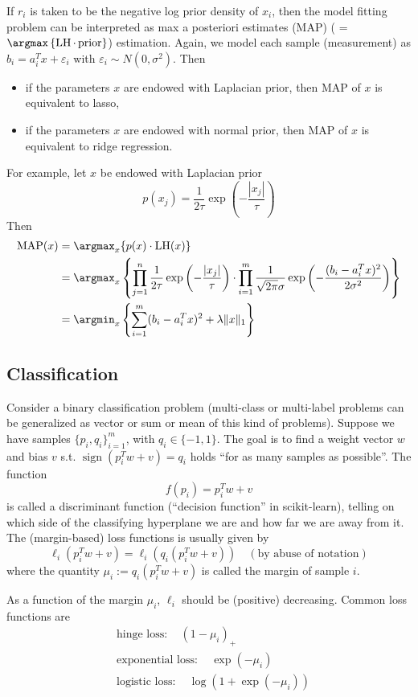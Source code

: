 If $r_i$ is taken to be the negative log prior density of $x_i$, then the model fitting problem can be interpreted as max a posteriori estimates (MAP) ( = $\argmax \left\{ \operatorname{LH} \cdot \operatorname{prior}\right\}$) estimation. Again, we model each sample (measurement) as
$b_i = a_i^Tx + \varepsilon_i$ with $\varepsilon_i \sim N(0, \sigma^2)$. Then 
\begin{itemize}
    \item if the parameters $x$ are endowed with Laplacian prior, then MAP of $x$ is equivalent to lasso,
    \item if the parameters $x$ are endowed with normal prior, then MAP of $x$ is equivalent to ridge regression.
\end{itemize}
For example, let $x$ be endowed with Laplacian prior
$$p(x_j) = \dfrac{1}{2\tau}\exp\left( -\dfrac{|x_j|}{\tau} \right)$$
Then
\begin{align*}
\operatorname{MAP}(x) & = \argmax_x \{p(x) \cdot \operatorname{LH}(x) \} \\
& = \argmax_x \left\{ \prod\limits_{j=1}^n \dfrac{1}{2\tau}\exp\left( -\dfrac{|x_j|}{\tau} \right) \cdot \prod\limits_{i=1}^m \dfrac{1}{\sqrt{2\pi}\sigma} \exp\left(-\frac{(b_i-a_i^Tx)^2}{2\sigma^2}\right) \right\} \\
& = \argmin_x \left\{ \sum\limits_{i=1}^m (b_i-a_i^Tx)^2 + \lambda \lVert x \rVert_1 \right\}
\end{align*}

\subsection{Classification}

Consider a binary classification problem (multi-class or multi-label problems can be generalized as vector or sum or mean of this kind of problems). Suppose we have samples $\{p_i,q_i\}_{i=1}^m$, with $q_i\in\{-1,1\}$. The goal is to find a weight vector $w$ and bias $v$ s.t.
$\operatorname{sign}(p_i^Tw + v) = q_i$
holds ``for as many samples as possible''. The function
$$f(p_i) = p_i^Tw + v$$
is called a discriminant function (``decision function'' in scikit-learn), telling on which side of the classifying hyperplane we are and how far we are away from it. The (margin-based) loss functions is usually given by
$$\ell_i(p_i^Tw + v) = \ell_i(q_i(p_i^Tw + v)) \quad (\text{by abuse of notation})$$
where the quantity $\mu_i := q_i(p_i^Tw + v)$ is called the margin of sample $i$.

As a function of the margin $\mu_i$, $\ell_i$ should be (positive) decreasing. Common loss functions are
\begin{align*}
    & \text{hinge loss}: \quad (1-\mu_i)_+ \\
    & \text{exponential loss}: \quad \exp(-\mu_i) \\
    & \text{logistic loss}: \quad \log(1+\exp(-\mu_i))
\end{align*}


